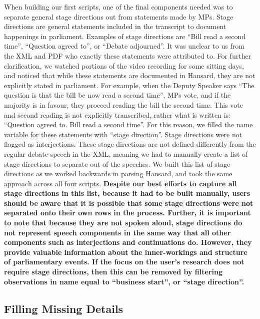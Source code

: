 \documentclass[
  letterpaper,
  DIV=11,
  numbers=noendperiod]{scrartcl}
\begin{document}
When building our first scripts, one of the final components needed was
to separate general stage directions out from statements made by MPs.
Stage directions are general statements included in the transcript to
document happenings in parliament. Examples of stage directions are
``Bill read a second time'', ``Question agreed to'', or ``Debate
adjourned''. It was unclear to us from the XML and PDF who exactly these
statements were attributed to. For further clarification, we watched
portions of the video recording for some sitting days, and noticed that
while these statements are documented in Hansard, they are not
explicitly stated in parliament. For example, when the Deputy Speaker
says ``The question is that the bill be now read a second time'', MPs
vote, and if the majority is in favour, they proceed reading the bill
the second time. This vote and second reading is not explicitly
transcribed, rather what is written is: ``Question agreed to. Bill read
a second time''. For this reason, we filled the name variable for these
statements with ``stage direction''. Stage directions were not flagged
as interjections. These stage directions are not defined differently
from the regular debate speech in the XML, meaning we had to manually
create a list of stage directions to separate out of the speeches. We
built this list of stage directions as we worked backwards in parsing
Hansard, and took the same approach across all four scripts.
\textbf{Despite our best efforts to capture all stage directions in this
list, because it had to be built manually, users should be aware that it
is possible that some stage directions were not separated onto their own
rows in the process. Further, it is important to note that because they
are not spoken aloud, stage directions do not represent speech
components in the same way that all other components such as
interjections and continuations do. However, they provide valuable
information about the inner-workings and structure of parliamentary
events. If the focus on the user's research does not require stage
directions, then this can be removed by filtering observations in name
equal to ``business start'', or ``stage direction''.}

\hypertarget{filling-missing-details}{%
\subsection{Filling Missing Details}\label{filling-missing-details}}
\end{document}

